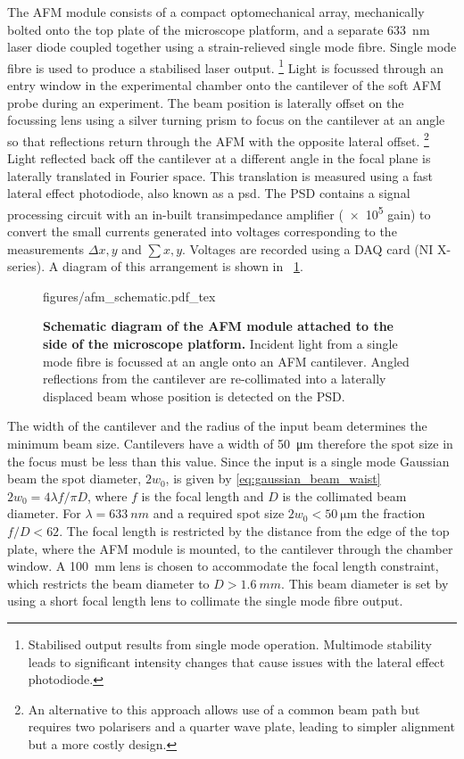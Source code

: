 \documentclass{article}
\begin{document}
The AFM module consists of a compact optomechanical {\color{red}array}, mechanically bolted onto the top plate of the microscope platform, and a separate \SI{633}{nm} laser diode coupled together using a strain-relieved single mode fibre. Single mode fibre is used to produce a stabilised laser output.%
\footnote{Stabilised output results from single mode operation. Multimode stability leads to significant intensity changes that cause issues with the lateral effect photodiode.}
Light is focussed through an entry window in the experimental chamber onto the cantilever of the soft AFM probe during an experiment. The beam position is laterally offset on the focussing lens using a silver turning prism to focus on the cantilever at an angle so that reflections return through the AFM with the opposite lateral offset.%
\footnote{An alternative to this approach allows use of a common beam path but requires two polarisers and a quarter wave plate, leading to simpler alignment but a more costly design.}
Light reflected back off the cantilever at a different angle in the focal plane is laterally translated in Fourier space. This translation is measured using a fast lateral effect photodiode, also known as a \gls{psd}. The PSD contains a signal processing circuit with an in-built transimpedance amplifier (\num{e5} gain) to convert the small currents generated into voltages corresponding to the measurements $\Delta x,y$ and $\sum x,y$. Voltages are recorded using a DAQ card (NI X-series). A diagram of this arrangement is shown in \figurename~\ref{fig:afm_design}.

\begin{figure}[bt]
\centering
{\fontsize{9.5pt}{1em}\selectfont \def\svgwidth{0.8\textwidth} {figures/afm_schematic.pdf_tex}}
\caption[Schematic diagram of the AFM module.]{\textbf{Schematic diagram of the AFM module attached to the side of the microscope platform.} Incident light from a single mode fibre is focussed at an angle onto an AFM cantilever. Angled reflections from the cantilever are re-collimated into a laterally displaced beam whose position is detected on the PSD.}
\label{fig:afm_design}
\end{figure}

The width of the cantilever and the radius of the input beam determines the minimum beam size. Cantilevers have a width of \SI{50}{\micro\metre} therefore the spot size in the focus must be less than this value. Since the input is a single mode Gaussian beam the spot diameter, $2w_0$, is given by \eqref{eq:gaussian_beam_waist} $2w_0 = 4\lambda f/ \pi D$, where $f$ is the focal length and $D$ is the collimated beam diameter. For $\lambda=\SI{633}{nm}$ and a required spot size $2w_0 < \SI{50}{\micro\metre}$ the fraction $f/D < 62$. The focal length is restricted by the distance from the edge of the top plate, where the AFM module is mounted, to the cantilever through the chamber window. A \SI{100}{mm} lens is chosen to accommodate the focal length constraint, which restricts the beam diameter to $D > \SI{1.6}{mm}$. This beam diameter is set by using a short focal length lens to collimate the single mode fibre output.
\end{document}
